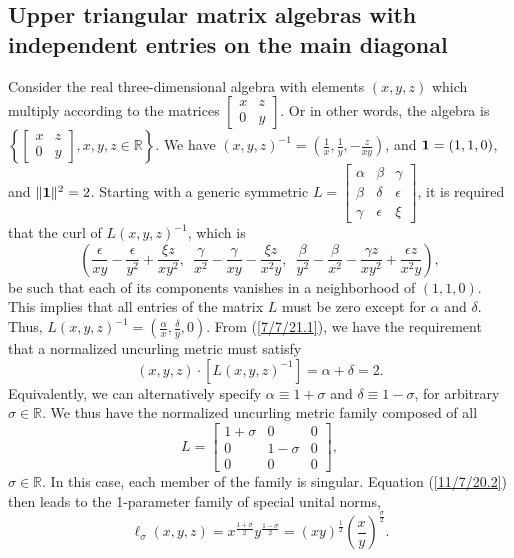 \documentclass{amsart}
\numberwithin{equation}{section}
\theoremstyle{definition}
\numberwithin{theorem}{section}
\begin{document}
 \subsection{Upper triangular matrix algebras with independent entries on the main diagonal} Consider the real three-dimensional algebra with elements $(x,y,z)$ which multiply according to the matrices 
$\left[
\begin{array}{ccc}
 x & z   \\
 0 & y    
\end{array}
\right]$.  Or in other words, the algebra is $\left\{ \left[
\begin{array}{ccc}
 x & z   \\
 0 & y    
\end{array}
\right],x,y,z\in\mathbb{R}\right\}$.  We have $(x,y,z)^{-1} = \left( \frac{1}{x}, \frac{1}{y}, -\frac{z}{xy} \right)$, and ${\bf 1}= (1,1,0)$, and $\|{\bf 1}\|^2 = 2$.  Starting with a generic symmetric $L = \left[
\begin{array}{ccc}
 \alpha & \beta & \gamma   \\
 \beta & \delta & \epsilon \\ \gamma & \epsilon & \xi    
\end{array}
\right]$, 
it is required that the curl of $L(x,y,z)^{-1}$, which is \[\left( \frac{\epsilon}{xy} - \frac{\epsilon}{y^2} + \frac{\xi z}{xy^2},\,\,\, \frac{\gamma}{x^2} - \frac{\gamma}{xy} - \frac{\xi z}{x^2y}, \,\,\, \frac{\beta}{y^2} - \frac{\beta}{x^2} - \frac{\gamma z}{xy^2} + \frac{\epsilon z}{x^2y} \right),\] be such that each of its components vanishes in a neighborhood of $(1,1,0)$.  This implies that all entries of the matrix $L$ must be zero except for $\alpha$ and $\delta$.   Thus, $L(x,y,z)^{-1} = (\frac{\alpha}{x}, \frac{\delta}{y},0)$.  From (\ref{7/7/21.1}), we have the requirement that a normalized uncurling metric must satisfy \[ (x,y,z)\cdot [L(x,y,z)^{-1}] = \alpha +\delta =  2.\]  Equivalently, we can alternatively specify $\alpha \equiv 1+\sigma$ and $\delta \equiv 1-\sigma$, for arbitrary $\sigma\in\mathbb{R}$.   We thus have the normalized uncurling metric family composed of all  \begin{equation}\label{11/17/22.2} L = \left[
\begin{array}{ccc}
 1+\sigma & 0 & 0   \\
 0 & 1-\sigma & 0 \\ 0 & 0 & 0    
\end{array}
\right],\end{equation} $\sigma\in\mathbb{R}$.  In this case, each member of the family is singular.  Equation (\ref{11/7/20.2}) then leads to the 1-parameter family of special unital norms, \begin{equation}\label{12/21/21.1} \ell_\sigma(x,y,z) = x^\frac{1+\sigma}{2} y^\frac{1-\sigma}{2} = (xy)^{\frac{1}{2}}\left(\frac{x}{y}\right)^{\frac{\sigma}{2}}.\end{equation} 
\end{document}
